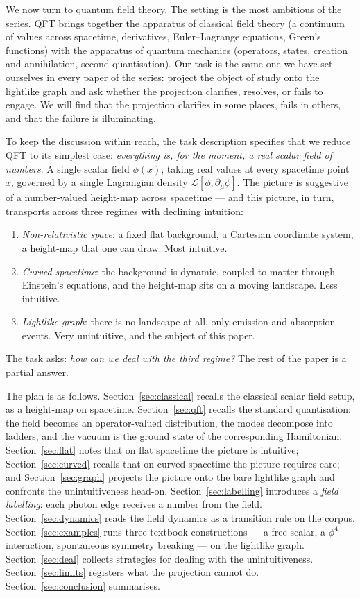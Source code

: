 \documentclass[11pt]{article}
\begin{document}
We now turn to quantum field theory. The setting is the most ambitious of the series. QFT brings together the apparatus of classical field theory (a continuum of values across spacetime, derivatives, Euler--Lagrange equations, Green's functions) with the apparatus of quantum mechanics (operators, states, creation and annihilation, second quantisation). Our task is the same one we have set ourselves in every paper of the series: project the object of study onto the lightlike graph and ask whether the projection clarifies, resolves, or fails to engage. We will find that the projection clarifies in some places, fails in others, and that the failure is illuminating.

To keep the discussion within reach, the task description specifies that we reduce QFT to its simplest case: \emph{everything is, for the moment, a real scalar field of numbers}. A single scalar field $\phi(x)$, taking real values at every spacetime point $x$, governed by a single Lagrangian density $\mathcal{L}[\phi, \partial_\mu \phi]$. The picture is suggestive of a number-valued height-map across spacetime --- and this picture, in turn, transports across three regimes with declining intuition:
\begin{enumerate}
    \item \emph{Non-relativistic space}: a fixed flat background, a Cartesian coordinate system, a height-map that one can draw. Most intuitive.
    \item \emph{Curved spacetime}: the background is dynamic, coupled to matter through Einstein's equations, and the height-map sits on a moving landscape. Less intuitive.
    \item \emph{Lightlike graph}: there is no landscape at all, only emission and absorption events. Very unintuitive, and the subject of this paper.
\end{enumerate}
The task asks: \emph{how can we deal with the third regime?} The rest of the paper is a partial answer.

The plan is as follows. Section~\ref{sec:classical} recalls the classical scalar field setup, as a height-map on spacetime. Section~\ref{sec:qft} recalls the standard quantisation: the field becomes an operator-valued distribution, the modes decompose into ladders, and the vacuum is the ground state of the corresponding Hamiltonian. Section~\ref{sec:flat} notes that on flat spacetime the picture is intuitive; Section~\ref{sec:curved} recalls that on curved spacetime the picture requires care; and Section~\ref{sec:graph} projects the picture onto the bare lightlike graph and confronts the unintuitiveness head-on. Section~\ref{sec:labelling} introduces a \emph{field labelling}: each photon edge receives a number from the field. Section~\ref{sec:dynamics} reads the field dynamics as a transition rule on the corpus. Section~\ref{sec:examples} runs three textbook constructions --- a free scalar, a $\phi^4$ interaction, spontaneous symmetry breaking --- on the lightlike graph. Section~\ref{sec:deal} collects strategies for dealing with the unintuitiveness. Section~\ref{sec:limits} registers what the projection cannot do. Section~\ref{sec:conclusion} summarises.
\end{document}
